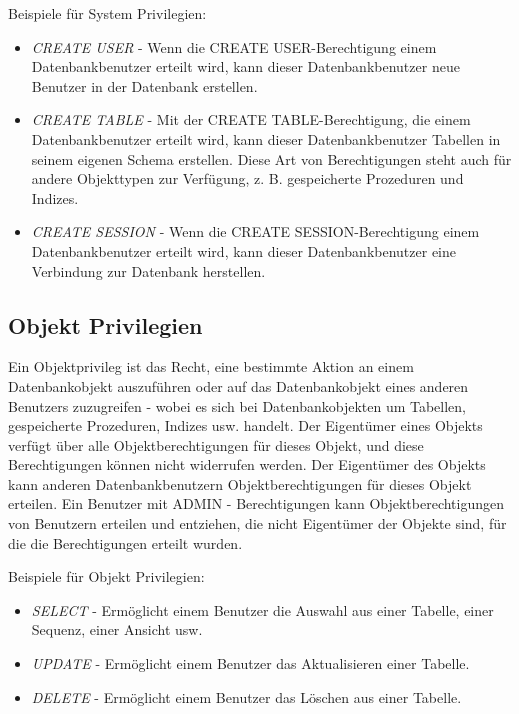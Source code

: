 Beispiele für System Privilegien:

\begin{itemize}
    \item \emph{CREATE USER} - Wenn die CREATE USER-Berechtigung einem Datenbankbenutzer erteilt wird, kann dieser Datenbankbenutzer neue Benutzer in der Datenbank erstellen. 
    \item \emph{CREATE TABLE} - Mit der CREATE TABLE-Berechtigung, die einem Datenbankbenutzer erteilt wird, kann dieser Datenbankbenutzer Tabellen in seinem eigenen Schema erstellen. Diese Art von Berechtigungen steht auch für andere Objekttypen zur Verfügung, z. B. gespeicherte Prozeduren und Indizes.
    \item \emph{CREATE SESSION} - Wenn die CREATE SESSION-Berechtigung einem Datenbankbenutzer erteilt wird, kann dieser Datenbankbenutzer eine Verbindung zur Datenbank herstellen. 
\end{itemize}

\subsection{Objekt Privilegien}
Ein Objektprivileg ist das Recht, eine bestimmte Aktion an einem Datenbankobjekt auszuführen oder auf das Datenbankobjekt eines anderen Benutzers zuzugreifen - wobei es sich bei Datenbankobjekten um Tabellen, gespeicherte Prozeduren, Indizes usw. handelt. Der Eigentümer eines Objekts verfügt über alle Objektberechtigungen für dieses Objekt, und diese Berechtigungen können nicht widerrufen werden. Der Eigentümer des Objekts kann anderen Datenbankbenutzern Objektberechtigungen für dieses Objekt erteilen. Ein Benutzer mit ADMIN - Berechtigungen kann Objektberechtigungen von Benutzern erteilen und entziehen, die nicht Eigentümer der Objekte sind, für die die Berechtigungen erteilt wurden. 

Beispiele für Objekt Privilegien:

\begin{itemize}
    \item \emph{SELECT} - Ermöglicht einem Benutzer die Auswahl aus einer Tabelle, einer Sequenz, einer Ansicht usw. 
    \item \emph{UPDATE} - Ermöglicht einem Benutzer das Aktualisieren einer Tabelle. 
    \item \emph{DELETE} - Ermöglicht einem Benutzer das Löschen aus einer Tabelle. 
\end{itemize}

